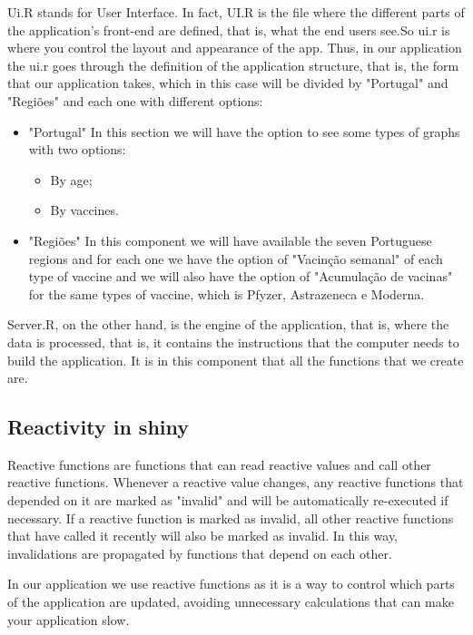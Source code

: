 \documentclass[11pt,a4paper]{report}
\begin{document}
 Ui.R stands for User Interface. In fact, UI.R is the file where the different parts of the application's front-end are defined, that is, what the end users see.So ui.r is where you control the layout and appearance of the app.
 Thus, in our application the ui.r goes through the definition of the application structure, that is, the form that our application takes, which in this case will be divided by "Portugal" and "Regiões" and each one with different options: 
 \begin{itemize}
    \item "Portugal" 
    In this section we will have the option to see some types of graphs with two options: 
     \begin{itemize}
        \item By age; 
        \item By vaccines.

        
        \end{itemize}
    \item "Regiões"
     In this component we will have available the seven Portuguese regions and for each one we have the option of "Vacinção semanal" of each type of vaccine and we will also have the option of "Acumulação de vacinas" for the same types of vaccine, which is Pfyzer, Astrazeneca e Moderna.
     

    
\end{itemize}

Server.R, on the other hand, is the engine of the application, that is, where the data is processed, that is, it contains the instructions that the computer needs to build the application. It is in this component that all the functions that we create are. 

\subsection{Reactivity in shiny}
   Reactive functions are functions that can read reactive values and call other reactive functions. Whenever a reactive value changes, any reactive functions that depended on it are marked as "invalid" and will be automatically re-executed if necessary. If a reactive function is marked as invalid, all other reactive functions that have called it recently will also be marked as invalid. In this way, invalidations are propagated by functions that depend on each other.

In our application we use reactive functions as it is a way to control which parts of the application are updated, avoiding unnecessary calculations that can make your application slow.
\end{document}
